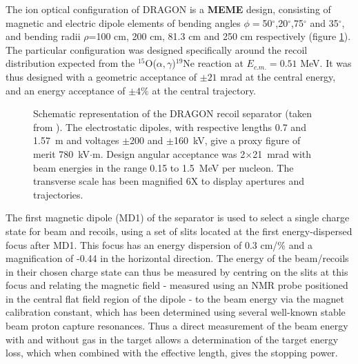 The ion optical configuration of DRAGON is a {\bf MEME} design, consisting of magnetic and electric  dipole elements of bending angles $\phi=$50$^{\circ}$,20$^{\circ}$,75$^{\circ}$ and 35$^{\circ}$, and bending radii $\rho$=100 cm, 200 cm, 81.3 cm and 250 cm respectively (figure \ref{fig:dra_optics}). The particular configuration was designed specifically around the recoil distribution expected from the $^{15}$O($\alpha ,\gamma$)$^{19}$Ne reaction at $E_{c.m.}=0.51$ MeV. It was thus designed with a geometric acceptance of $\pm21$ mrad at the central energy, and an energy acceptance of $\pm4\%$ at the central trajectory. 

\begin{figure}
\caption{Schematic representation of the DRAGON recoil separator (taken from \cite{hut03}). The electrostatic dipoles, with respective lengths 0.7 and 1.57~m and voltages $\pm$200 and $\pm$160~kV, give a proxy figure of merit 780~kV$\cdot$m.  Design angular acceptance was 2$\times$21~mrad with beam energies in the range 0.15 to 1.5~MeV per nucleon. The transverse scale has been magnified 6X to display apertures and trajectories.}
\label{fig:dra_optics}
\end{figure}

The first magnetic dipole (MD1) of the separator is used to select a single charge state for beam and recoils, using a set of slits located at the first energy-dispersed focus after MD1. This focus has an energy dispersion of 0.3 cm/\% and a magnification of -0.44 in the horizontal direction. The energy of the beam/recoils in their chosen charge state can thus be measured by centring on the slits at this focus and relating the magnetic field - measured using an NMR probe positioned in the central flat field region of the dipole - to the beam energy via the magnet calibration constant, which has been determined using several well-known stable beam proton capture resonances. Thus a direct measurement of the beam energy with and without gas in the target allows a determination of the target energy loss, which when combined with the effective length, gives the stopping power. 

